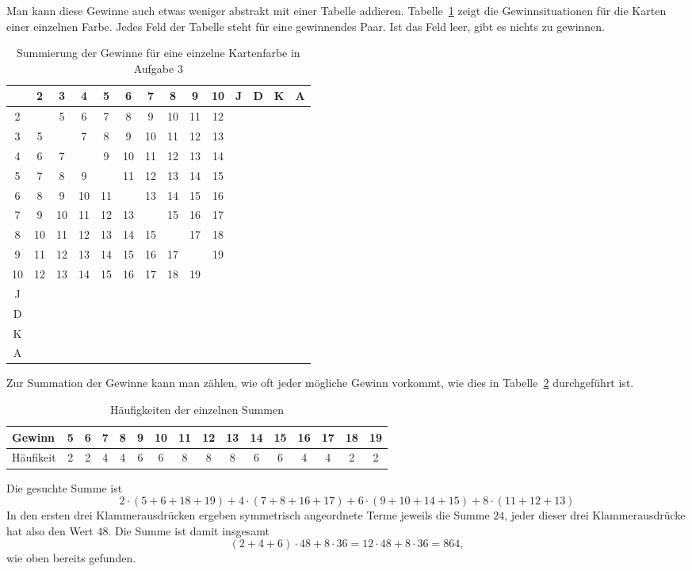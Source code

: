 \begin{loesung}
\begin{teilaufgaben}
Man kann diese Gewinne auch etwas weniger abstrakt mit einer Tabelle
addieren. Tabelle~\ref{tabelle} zeigt die Gewinnsituationen für die
Karten einer einzelnen Farbe. Jedes Feld der Tabelle steht für eine gewinnendes
Paar. Ist das Feld leer, gibt es nichts zu gewinnen.
\begin{table}
\begin{center}
\begin{tabular}{c|c|c|c|c|c|c|c|c|c|c|c|c|c|}
  & 2& 3& 4& 5& 6& 7& 8& 9&10& J& D& K& A\\
\hline
2 &  & 5& 6& 7& 8& 9&10&11&12&  &  &  &  \\
3 & 5&  & 7& 8& 9&10&11&12&13&  &  &  &  \\
4 & 6& 7&  & 9&10&11&12&13&14&  &  &  &  \\
5 & 7& 8& 9&  &11&12&13&14&15&  &  &  &  \\
6 & 8& 9&10&11&  &13&14&15&16&  &  &  &  \\
7 & 9&10&11&12&13&  &15&16&17&  &  &  &  \\
8 &10&11&12&13&14&15&  &17&18&  &  &  &  \\
9 &11&12&13&14&15&16&17&  &19&  &  &  &  \\
10&12&13&14&15&16&17&18&19&  &  &  &  &  \\
J &  &  &  &  &  &  &  &  &  &  &  &  &  \\
D &  &  &  &  &  &  &  &  &  &  &  &  &  \\
K &  &  &  &  &  &  &  &  &  &  &  &  &  \\
A &  &  &  &  &  &  &  &  &  &  &  &  &  \\
\hline
\end{tabular}
\end{center}
\caption{Summierung der Gewinne für eine einzelne Kartenfarbe
in Aufgabe 3\label{tabelle}}
\end{table}
Zur Summation der Gewinne kann man zählen, wie oft jeder
mögliche Gewinn vorkommt, wie dies in Tabelle~\ref{haeufigkeiten}
durchgeführt ist.
\begin{table}
\begin{center}
\begin{tabular}{|l|c|c|c|c|c|c|c|c|c|c|c|c|c|c|c|}
\hline
Gewinn    &5&6&7&8&9&10&11&12&13&14&15&16&17&18&19\\
\hline
Häufikeit&2&2&4&4&6& 6& 8& 8& 8& 6& 6& 4& 4& 2& 2\\
\hline
\end{tabular}
\end{center}
\caption{Häufigkeiten der einzelnen Summen\label{haeufigkeiten}}
\end{table}
Die gesuchte Summe ist
\[
2\cdot(5+6+18+19)
+
4\cdot(7+8+16+17)
+
6\cdot(9+10+14+15)
+
8\cdot(11+12+13)
\]
In den ersten drei Klammerausdrücken ergeben symmetrisch
angeordnete Terme jeweils die Summe $24$, jeder dieser
drei Klammerausdrücke hat also den Wert $48$. Die Summe ist
damit insgesamt
\[
(2+4+6)\cdot 48+8\cdot 36=12\cdot 48+8\cdot 36
=
864,
\]
wie oben bereits gefunden.


\end{teilaufgaben}
\end{loesung}
